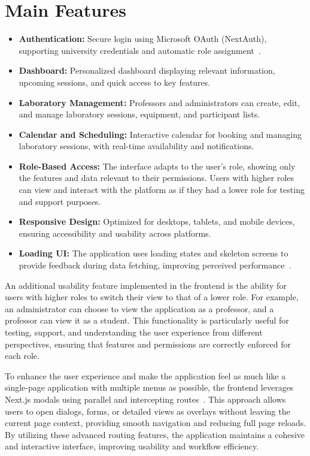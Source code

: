 \section{Main Features}
\begin{itemize}
    \item \textbf{Authentication:} Secure login using Microsoft OAuth (NextAuth), supporting university credentials and automatic role assignment~\cite{nextjs-authentication}.
    \item \textbf{Dashboard:} Personalized dashboard displaying relevant information, upcoming sessions, and quick access to key features.
    \item \textbf{Laboratory Management:} Professors and administrators can create, edit, and manage laboratory sessions, equipment, and participant lists.
    \item \textbf{Calendar and Scheduling:} Interactive calendar for booking and managing laboratory sessions, with real-time availability and notifications.
    \item \textbf{Role-Based Access:} The interface adapts to the user's role, showing only the features and data relevant to their permissions. Users with higher roles can view and interact with the platform as if they had a lower role for testing and support purposes.
    \item \textbf{Responsive Design:} Optimized for desktops, tablets, and mobile devices, ensuring accessibility and usability across platforms.
    \item \textbf{Loading UI:} The application uses loading states and skeleton screens to provide feedback during data fetching, improving perceived performance~\cite{nextjs-loading-ui}.
\end{itemize}

An additional usability feature implemented in the frontend is the ability for users with higher roles to switch their view to that of a lower role. For example, an administrator can choose to view the application as a professor, and a professor can view it as a student. This functionality is particularly useful for testing, support, and understanding the user experience from different perspectives, ensuring that features and permissions are correctly enforced for each role.

To enhance the user experience and make the application feel as much like a single-page application with multiple menus as possible, the frontend leverages Next.js modals using parallel and intercepting routes~\cite{nextjs-app-router}. This approach allows users to open dialogs, forms, or detailed views as overlays without leaving the current page context, providing smooth navigation and reducing full page reloads. By utilizing these advanced routing features, the application maintains a cohesive and interactive interface, improving usability and workflow efficiency.


